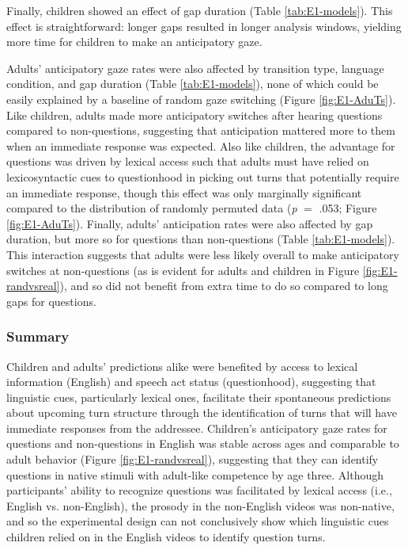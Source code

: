 \documentclass[authoryear, 12pt]{elsarticle}
\begin{document}
Finally, children showed an effect of gap duration (Table \ref{tab:E1-models}). This effect is straightforward: longer gaps resulted in longer analysis windows, yielding more time for children to make an anticipatory gaze.

Adults' anticipatory gaze rates were also affected by transition type, language condition, and gap duration (Table \ref{tab:E1-models}), none of which could be easily explained by a baseline of random gaze switching (Figure \ref{fig:E1-AduTs}). Like children, adults made more anticipatory switches after hearing questions compared to non-questions, suggesting that anticipation mattered more to them when an immediate response was expected. Also like children, the advantage for questions was driven by lexical access such that adults must have relied on lexicosyntactic cues to questionhood in picking out turns that potentially require an immediate response, though this effect was only marginally significant compared to the distribution of randomly permuted data (\textit{p} $=$ .053; Figure \ref{fig:E1-AduTs}). Finally, adults' anticipation rates were also affected by gap duration, but more so for questions than non-questions (Table \ref{tab:E1-models}). This interaction suggests that adults were less likely overall to make anticipatory switches at non-questions (as is evident for adults and children in Figure \ref{fig:E1-randvsreal}), and so did not benefit from extra time to do so compared to long gaps for questions.

\subsubsection{Summary}
\label{sec:summary1}

Children and adults' predictions alike were benefited by access to lexical information (English) and speech act status (questionhood), suggesting that linguistic cues, particularly lexical ones, facilitate their spontaneous predictions about upcoming turn structure through the identification of turns that will have immediate responses from the addressee. Children's anticipatory gaze rates for questions and non-questions in English was stable across ages and comparable to adult behavior (Figure \ref{fig:E1-randvsreal}), suggesting that they can identify questions in native stimuli with adult-like competence by age three. Although participants' ability to recognize questions was facilitated by lexical access (i.e., English vs. non-English), the prosody in the non-English videos was non-native, and so the experimental design can not conclusively show which linguistic cues children relied on in the English videos to identify question turns.
\end{document}
